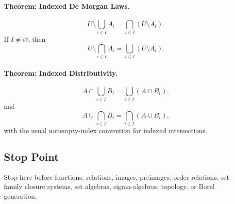 \paragraph{Theorem: Indexed De Morgan Laws.}
\[
  U\setminus\bigcup_{i\in I}A_i
  =
  \bigcap_{i\in I}(U\setminus A_i).
\]
If \(I\neq\varnothing\), then
\[
  U\setminus\bigcap_{i\in I}A_i
  =
  \bigcup_{i\in I}(U\setminus A_i).
\]

\paragraph{Theorem: Indexed Distributivity.}
\[
  A\cap\bigcup_{i\in I}B_i
  =
  \bigcup_{i\in I}(A\cap B_i),
\]
and
\[
  A\cup\bigcap_{i\in I}B_i
  =
  \bigcap_{i\in I}(A\cup B_i),
\]
with the usual nonempty-index convention for indexed intersections.

\subsection*{Stop Point}

Stop here before functions, relations, images, preimages, order relations,
set-family closure systems, set algebras, sigma-algebras, topology, or Borel
generation.

